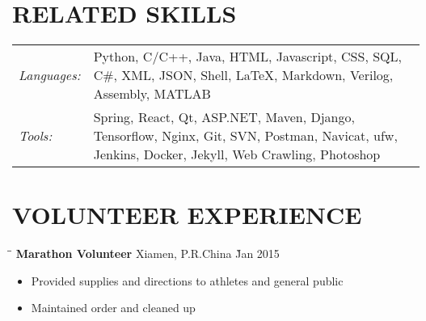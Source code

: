 \documentclass{res}
\begin{document}
\begin{resume}
\vspace{+0.05in}	
\section{RELATED SKILLS}  
    \vspace{+0.05in}	 
    \begin{tabular}{l p{4.6in}}
    {\sl Languages:} & Python, C/C++, Java, HTML, Javascript, CSS, 
                       SQL, C\#, XML, JSON, Shell, LaTeX, Markdown, Verilog, 
                       Assembly, MATLAB \\ 
    {\sl Tools:}  &  Spring, React, Qt, ASP.NET, Maven, Django, Tensorflow, Nginx, 
                        Git, SVN, Postman, Navicat, ufw, Jenkins, Docker, Jekyll, 
                        Web Crawling, Photoshop
    \end{tabular}   

\vspace{-0.12in}	
\section{VOLUNTEER EXPERIENCE}
    \vspace{-0.1in}
    \begin{tabbing}
    \hspace{2.3in}\= \hspace{2.6in}\= \kill %
    {\bf Marathon Volunteer} \> Xiamen, P.R.China     \` Jan 2015\\
    \end{tabbing}\vspace{-20pt}      %
    \begin{itemize} \itemsep -2pt %
    \item Provided supplies and directions to athletes and general public
    \item Maintained order and cleaned up
    \end{itemize}

\vspace{-0.12in}	    

\end{resume}
\end{document}
